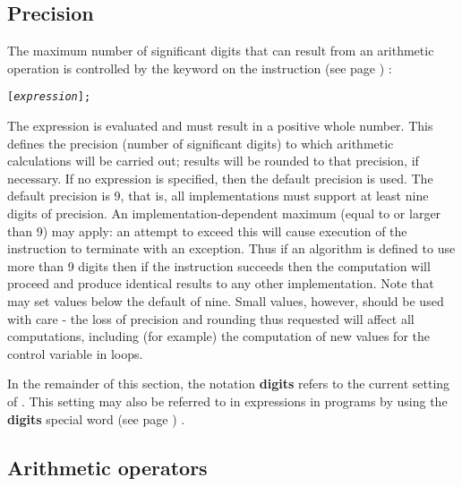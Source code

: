 \subsection{Precision}\label{refndi2}
 The maximum number of significant digits that can result from an
arithmetic operation is controlled by the  keyword on the
  instruction (see page \pageref{refnumeric}) :
\begin{alltt}
 [\emph{expression}];
\end{alltt}
The expression is evaluated and must result in a positive whole
number.
This defines the precision (number of significant digits) to which
arithmetic calculations will be carried out; results will be rounded to
that precision,
if necessary.
 If no expression is specified, then the default precision is used.
The default precision is 9, that is, all implementations must support
at least nine digits of precision.  An implementation-dependent maximum
(equal to or larger than 9) may apply: an attempt to exceed this will
cause execution of the instruction to terminate with an exception.
Thus if an algorithm is defined to use more than 9 digits then if
the  instruction succeeds then the computation
will proceed and produce identical results to any other implementation.
 Note that  may set values below the default of
nine.
Small values, however, should be used with care - the loss of
precision and rounding thus requested will affect all \nr{}
computations, including (for example) the computation of new values for
the control variable in loops.
 
In the remainder of this section, the notation \textbf{digits} refers
to the current setting of .
This setting may also be referred to in expressions in programs by using
the \textbf{digits}  special word (see page \pageref{refspecial}) .
\subsection{Arithmetic operators}
 
